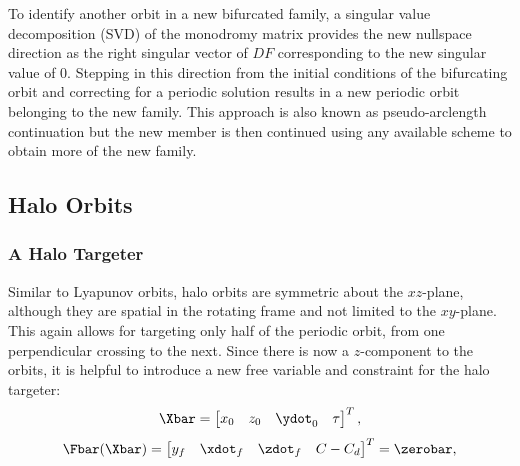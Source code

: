 To identify another orbit in a new bifurcated family, a singular value decomposition (SVD) of the
monodromy matrix provides the new nullspace direction as the right singular vector of $DF$
corresponding to the new singular value of $0$. Stepping in this direction from the initial
conditions of the bifurcating orbit and correcting for a periodic solution results in a new
periodic orbit belonging to the new family. This approach is also known as pseudo-arclength
continuation but the new member is then continued using any available scheme to obtain more of the
new family.

\subsection{Halo Orbits}
\subsubsection{A Halo Targeter}
Similar to Lyapunov orbits, halo orbits are symmetric about the $xz$-plane, although they are
spatial in the rotating frame and not limited to the $xy$-plane. This again allows for
targeting only half of the periodic orbit, from one perpendicular crossing to the next. Since there
is now a $z$-component to the orbits, it is helpful to introduce a new free variable and constraint
for the halo targeter:
\begin{equation}
    \Xbar=\begin{bmatrix}   x_{0}   &   z_{0}   &   \ydot_{0}   &   \tau    \end{bmatrix}^{T},
    \label{eq:halofreevar}
\end{equation}
\begin{equation}
    \Fbar(\Xbar)=\begin{bmatrix}    y_{f}   &   \xdot_{f}   &   \zdot_{f}   &   C-C_{d} \end{bmatrix}^{T}=\zerobar,
    \label{eq:haloconst}
\end{equation}
\vspace{1mm}
